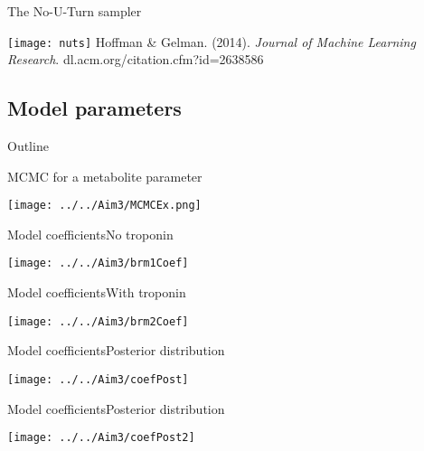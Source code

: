 \documentclass[xcolor=dvipsnames]{beamer}
\begin{document}
\begin{frame}{The No-U-Turn sampler}
\vspace{-10pt}
\begin{center}
\texttt{[image: nuts]}
\vspace{2ex}
Hoffman \& Gelman. (2014). \emph{Journal of Machine Learning Research}. dl.acm.org/citation.cfm?id=2638586
\end{center}
\end{frame}

\subsection{Model parameters}
\begin{frame}{Outline}
\vspace{-10.5pt}
\tableofcontents[currentsection,subsectionstyle=show/shaded/hide]
\end{frame}

\begin{frame}{MCMC for a metabolite parameter}
\vspace{-5pt}
\begin{center}
\texttt{[image: ../../Aim3/MCMCEx.png]}
\end{center}
\end{frame}


\begin{frame}{Model coefficients}{No troponin}
\vspace{-5pt}
\begin{center}
\texttt{[image: ../../Aim3/brm1Coef]}
\end{center}
\end{frame}

\begin{frame}{Model coefficients}{With troponin}
\vspace{-5pt}
\begin{center}
\texttt{[image: ../../Aim3/brm2Coef]}
\end{center}
\end{frame}

\begin{frame}{Model coefficients}{Posterior distribution}
\vspace{-5pt}
\begin{center}
\texttt{[image: ../../Aim3/coefPost]}
\end{center}
\end{frame}

\begin{frame}{Model coefficients}{Posterior distribution}
\vspace{-5pt}
\begin{center}
\texttt{[image: ../../Aim3/coefPost2]}
\end{center}
\end{frame}
\end{document}
